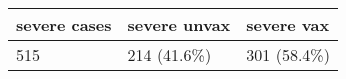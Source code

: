 \begin{table}[ht]
\centering
\begin{tabular}{lll}
  \toprule
{\textbf{severe cases}} & {\textbf{severe unvax}} & {\textbf{severe vax}} \\ 
  \midrule
515 & 214 (41.6\%) & 301 (58.4\%) \\ 
   \bottomrule
\end{tabular}
\end{table}
